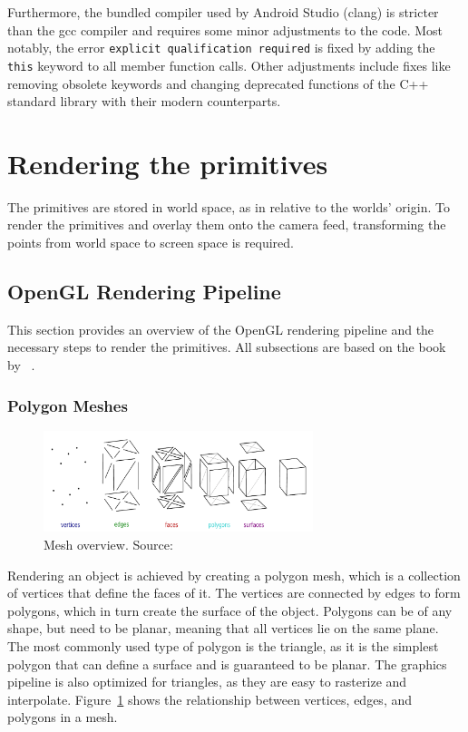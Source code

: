 Furthermore, the bundled compiler used by Android Studio (clang)
is stricter than the gcc compiler and requires some minor adjustments to the code.
Most notably, the error \texttt{explicit qualification required} is fixed by adding the
\texttt{this} keyword to all member function calls.
Other adjustments include fixes like removing obsolete keywords and changing deprecated
functions of the C++ standard library with their modern counterparts.



\section{Rendering the primitives}\label{sec:rendering-the-primitives}
The primitives are stored in world space, as in relative to the worlds' origin.
To render the primitives and overlay them onto the camera feed,
transforming the points from world space to screen space is required.

\subsection{OpenGL Rendering Pipeline}
This section provides an overview of the OpenGL rendering pipeline and the necessary steps to render the primitives.
All subsections are based on the book~ by \citeauthor{de_vries_learn_2020}~\parencite{de_vries_learn_2020}.

\subsubsection{Polygon Meshes}\label{subsec:polygon-meshes}

\begin{figure}[h]
    \centering
    \includegraphics[width=0.70\textwidth]{images/Mesh_overview}
    \caption{Mesh overview. Source:~\cite{dorner_virtual_2019}}
    \label{fig:mesh-overview}
\end{figure}

Rendering an object is achieved by creating a polygon mesh, which is a collection of vertices that define the faces of it.
The vertices are connected by edges to form polygons, which in turn create the surface of the object.
Polygons can be of any shape, but need to be planar, meaning that all vertices lie on the same plane.
The most commonly used type of polygon is the triangle, as it is the simplest polygon that can define a surface and is guaranteed to be planar.
The graphics pipeline is also optimized for triangles, as they are easy to rasterize and interpolate.
Figure~\ref{fig:mesh-overview} shows the relationship between vertices, edges, and polygons in a mesh. \cite{dorner_virtual_2019}

